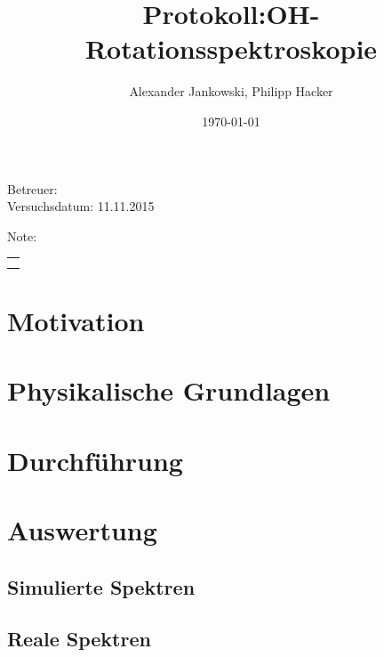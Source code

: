 \documentclass[numbers=noenddot,a4paper,notitlepage,twoside,BCOR15mm]{scrartcl}
\title{Protokoll:OH-Rotationsspektroskopie} %
\author{Alexander Jankowski, Philipp Hacker}
\date{\today}
\begin{document}
	\maketitle
	\begin{center}
		Betreuer: \\ %
		Versuchsdatum: 11.11.2015\\ %
		\begin{table}[h]
			\centering
			Note: %
			\begin{tabularx}{1.5cm}{|X|}
				\hline \\ \\
				\hline
			\end{tabularx}
		\end{table}
	\end{center}
	\vspace*{\fill}
	\tableofcontents
	\vfill
	\newpage
	\section{Motivation}
	
	\newpage
	\section{Physikalische Grundlagen}
	
	\newpage
	\section{Durchführung}
	
	\newpage
	\section{Auswertung}

		\subsection{Simulierte Spektren}

		\subsection{Reale Spektren}
\end{document}
